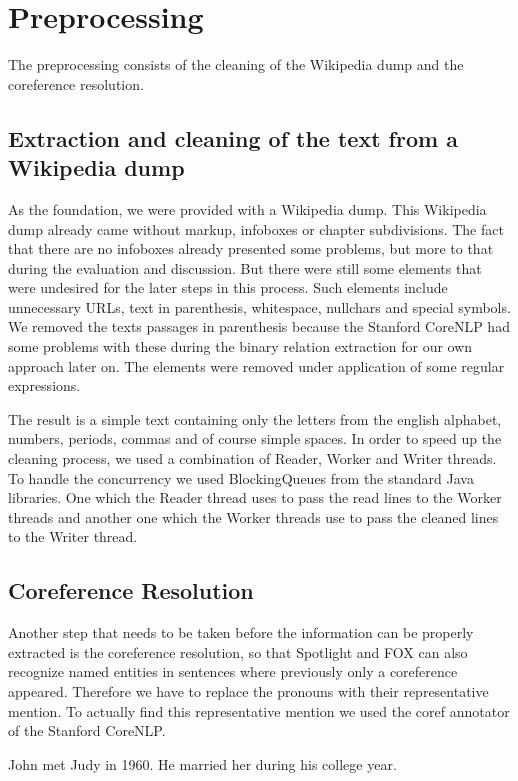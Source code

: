 \documentclass[runningheads]{llncs}
\begin{document}
\section{Preprocessing}
The preprocessing consists of the cleaning of the Wikipedia dump and the coreference resolution.
\subsection{Extraction and cleaning of the text from a Wikipedia dump}
As the foundation, we were provided with a Wikipedia dump. This Wikipedia dump already came without markup, infoboxes 
or chapter subdivisions. The fact that there are no infoboxes already presented some problems, but more to that during the evaluation and discussion. But there were still some elements that were undesired for the later steps in this process. Such elements include unnecessary URLs, text in parenthesis, whitespace, nullchars and special symbols. We removed the texts passages in parenthesis because the Stanford CoreNLP had some problems with these during the binary relation extraction for our own approach later on. The elements were removed under application of some regular expressions. 
\pagebreak

The result is a simple text containing only the letters from the english alphabet, numbers, periods, commas and of course simple spaces. In order to speed up the cleaning process, we used a combination of Reader, Worker and Writer threads. To handle the concurrency we used BlockingQueues from the standard Java libraries. One which the Reader thread uses to pass the read lines to the Worker threads and another one which the Worker threads use to pass the cleaned lines to the Writer thread.


\subsection{Coreference Resolution}
Another step that needs to be taken before the information can be properly extracted is the coreference resolution, so that Spotlight and FOX can also recognize named entities in sentences where previously only a coreference appeared. Therefore we have to replace the pronouns with their representative mention. To actually find this representative mention we used the coref annotator \cite{coref} of the Stanford CoreNLP.  

\begin{example} John met Judy in 1960. He married her during his college year.\end{example}
\end{document}
